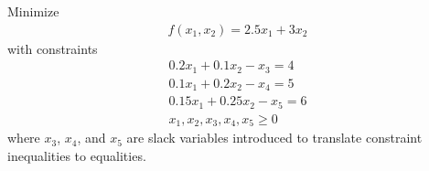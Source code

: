 \documentclass[11pt]{article}
\begin{document}
\begin{sol}
Minimize 
\begin{eqnarray*}
f(x_{1}, x_{2}) = 2.5x_{1} + 3x_{2}
\end{eqnarray*}
with constraints 
\begin{eqnarray*}
0.2x_{1} + 0.1x_{2} - x_{3} = 4 \\
0.1x_{1} + 0.2x_{2} - x_{4} = 5 \\
0.15x_{1} + 0.25x_{2} - x_{5} = 6 \\
x_{1}, x_{2}, x_{3}, x_{4}, x_{5} \geq 0 
\end{eqnarray*}
where $x_{3}$, $x_{4}$, and $x_{5}$ are slack variables introduced to translate constraint inequalities to equalities.
\end{sol}
\end{document}
